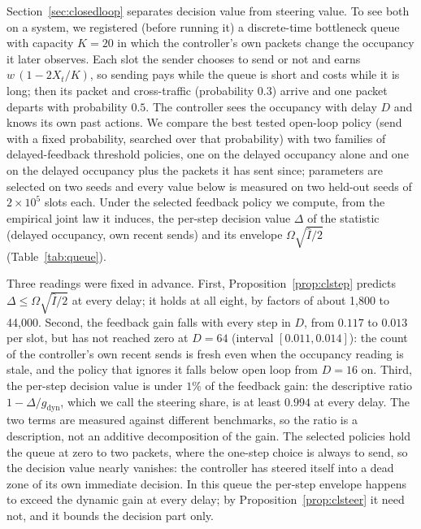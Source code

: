 \documentclass[acmsmall,screen,review,anonymous]{acmart}
\begin{document}
Section~\ref{sec:closedloop} separates decision value from steering value. To see
both on a system, we registered (before running it) a discrete-time
bottleneck queue with capacity $K=20$ in which the controller's own
packets change the occupancy it later observes. Each slot the sender
chooses to send or not and earns $w\,(1-2X_t/K)$, so sending pays while the
queue is short and costs while it is long; then its packet and
cross-traffic (probability $0.3$) arrive and one packet departs with
probability $0.5$. The controller sees the occupancy with delay $D$ and
knows its own past actions. We compare the best tested open-loop policy
(send with a fixed probability, searched over that probability) with two
families of delayed-feedback threshold policies,
one on the delayed occupancy alone and one on the delayed occupancy plus
the packets it has sent since; parameters are selected on two seeds and
every value below is measured on two held-out seeds of $2\times10^5$ slots
each. Under the selected feedback policy we compute, from the empirical
joint law it induces, the per-step decision value $\Delta$ of the statistic
(delayed occupancy, own recent sends) and its envelope
$\Omega\sqrt{\hat I/2}$ (Table~\ref{tab:queue}).

Three readings were fixed in advance. First, Proposition~\ref{prop:clstep}
predicts $\Delta\le\Omega\sqrt{\hat I/2}$ at every delay; it holds at all
eight, by factors of about 1{,}800 to 44{,}000. Second, the feedback gain
falls with every step in $D$, from $0.117$ to $0.013$ per slot, but has not
reached zero at $D=64$ (interval $[0.011,0.014]$): the count of the
controller's own recent sends is fresh even when the occupancy reading is
stale, and the policy that ignores it falls below open loop from $D=16$
on. Third, the per-step decision value is under $1\%$ of the feedback
gain: the descriptive ratio $1-\Delta/g_{\mathrm{dyn}}$, which we call the
steering share, is at least $0.994$ at every delay. The two terms are
measured against different benchmarks, so the ratio is a description,
not an additive decomposition of the gain.
The selected policies hold the queue at zero to two packets, where the
one-step choice is always to send, so the decision value nearly
vanishes: the controller has steered itself into a dead zone of its own
immediate decision. In this queue the per-step envelope happens to exceed
the dynamic gain at every delay; by Proposition~\ref{prop:clsteer} it need not,
and it bounds the decision part only.
\end{document}

